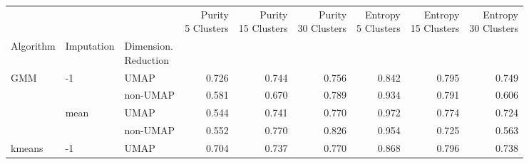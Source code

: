 \begin{tabular}{lllrrrrrr}
\toprule
       &      &          &  \thead{Purity \\5 Clusters} &  \thead{Purity \\15 Clusters} &  \thead{Purity \\30 Clusters} &  \thead{Entropy \\5 Clusters} &  \thead{Entropy \\15 Clusters} &  \thead{Entropy \\30 Clusters} \\
Algorithm & Imputation & \thead{Dimension. \\Reduction} &                                            &                                             &                                             &                                             &                                              &                                              \\
\midrule
GMM & -1 & UMAP &                                      0.726 &                                       0.744 &                                       0.756 &                                       0.842 &                                        0.795 &                                        0.749 \\
       &      & non-UMAP &                                      0.581 &                                       0.670 &                                       0.789 &                                       0.934 &                                        0.791 &                                        0.606 \\
       & mean & UMAP &                                      0.544 &                                       0.741 &                                       0.770 &                                       0.972 &                                        0.774 &                                        0.724 \\
       &      & non-UMAP &                                      0.552 &                                       0.770 &                                       0.826 &                                       0.954 &                                        0.725 &                                        0.563 \\
kmeans & -1 & UMAP &                                      0.704 &                                       0.737 &                                       0.770 &                                       0.868 &                                        0.796 &                                        0.738 \\

\end{tabular}
